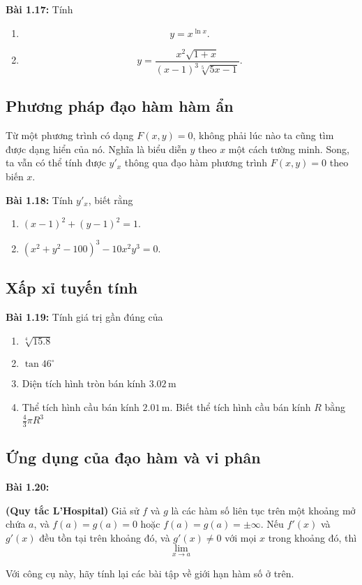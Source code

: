 \textbf{Bài 1.17:} Tính 
\begin{enumerate}[label=(\alph*)]
  \item \[y=x^{\ln x}.\]  
  \item \[y=\frac{x^2 \sqrt{1+x}}{(x-1)^3 \sqrt[5]{5x-1}}.\]
\end{enumerate}

\subsection*{Phương pháp đạo hàm hàm ẩn}
Từ một phương trình có dạng \(F(x,y)=0\), không phải lúc nào ta cũng tìm được dạng hiển của nó. Nghĩa là biểu diễn \(y\) theo \(x\) một cách tường minh. Song, ta vẫn có thể tính được \(y'_x\) thông qua đạo hàm phương trình \(F(x,y)=0\) theo biến \(x\).
\vspace{5pt}

\textbf{Bài 1.18:} Tính \(y'_x\), biết rằng
\begin{enumerate}
    \item \((x-1)^2 +(y-1)^2 =1.\)
    \item \((x^2+y^2-100)^3-10x^2y^3=0.\)
\end{enumerate}

\subsection*{Xấp xỉ tuyến tính}
\textbf{Bài 1.19:} Tính giá trị gần đúng của 
\begin{enumerate}[label=(\alph*)]
    \item $\sqrt[4]{15.8}$
    \item $\tan 46^\circ$
    \item Diện tích hình tròn bán kính $3.02\,\mathrm{m}$
    \item Thể tích hình cầu bán kính $2.01\,\mathrm{m}$. Biết thể tích hình cầu bán kính $R$ bằng $\frac{4}{3}\pi R^3$
\end{enumerate}
\vspace{5pt}



\subsection*{Ứng dụng của đạo hàm và vi phân}
\textbf{Bài 1.20:}
\begin{theorem}
\textbf{(Quy tắc L'Hospital)} Giả sử \(f\) và \(g\) là các hàm số liên tục trên một khoảng mở chứa \(a\), và \(f(a)=g(a)=0\) hoặc \(f(a)=g(a)=\pm \infty\). Nếu \(f'(x)\) và \(g'(x)\) đều tồn tại trên khoảng đó, và \(g'(x)\neq 0\) với mọi \(x\) trong khoảng đó, thì
\[\lim_{x\rightarrow a}\]
\end{theorem}
Với công cụ này, hãy tính lại các bài tập về giới hạn hàm số ở trên.
\vspace{5pt}


